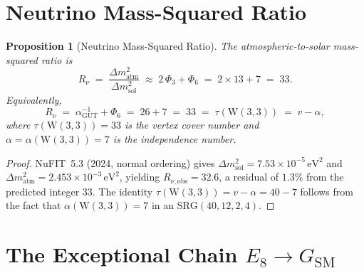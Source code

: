\documentclass[12pt,a4paper]{article}
\newtheorem{proposition}[theorem]{Proposition}
\newcommand{\W}{\mathrm{W}(3,3)}
\newcommand{\alphaGUT}{\alpha_{\!\mathrm{GUT}}}
\begin{document}
\section{Neutrino Mass-Squared Ratio}
\label{sec:Rnu}

\begin{proposition}[Neutrino Mass-Squared Ratio]\label{prop:Rnu}
The atmospheric-to-solar mass-squared ratio is
\[
  R_\nu \;=\;\frac{\Delta m^2_{\mathrm{atm}}}
                   {\Delta m^2_{\mathrm{sol}}}
  \;\approx\;2\,\Phi_3+\Phi_6
  \;=\;2\times 13+7\;=\;33.
\]
Equivalently,
\[
  R_\nu\;=\;\alphaGUT^{-1}+\Phi_6\;=\;26+7\;=\;33
  \;=\;\tau(\W)\;=\;v-\alpha,
\]
where $\tau(\W)=33$ is the vertex cover number and
$\alpha=\alpha(\W)=7$ is the independence number.
\end{proposition}

\begin{proof}
NuFIT~5.3 (2024, normal ordering) gives
$\Delta m^2_{\mathrm{sol}}=7.53\times 10^{-5}\,\mathrm{eV}^2$ and
$\Delta m^2_{\mathrm{atm}}=2.453\times 10^{-3}\,\mathrm{eV}^2$,
yielding $R_{\nu,\mathrm{obs}}=32.6$, a residual of $1.3\%$
from the predicted integer $33$.
The identity $\tau(\W)=v-\alpha=40-7$ follows from the fact that
$\alpha(\W)=7$ in an $\mathrm{SRG}(40,12,2,4)$.
\end{proof}

\section{The Exceptional Chain $E_8 \to G_{\mathrm{SM}}$}
\label{sec:e8chain}
\end{document}
